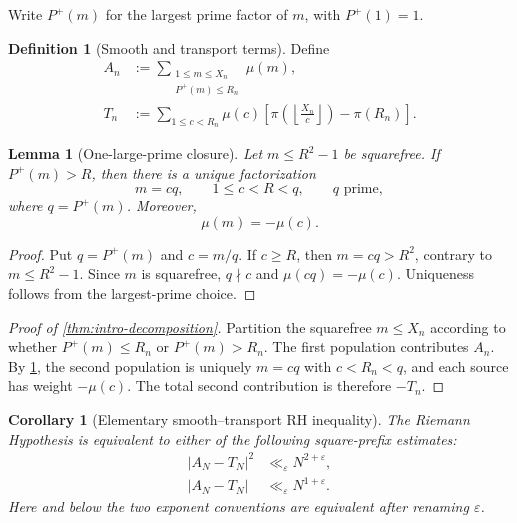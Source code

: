 \documentclass[11pt]{article}
\newtheorem{lemma}[theorem]{Lemma}
\newtheorem{corollary}[theorem]{Corollary}
\theoremstyle{definition}
\newtheorem{definition}[theorem]{Definition}
\theoremstyle{remark}
\newcommand{\eps}{\varepsilon}
\newcommand{\Pplus}{P^{+}}
\newcommand{\1}{\mathbf{1}}
\begin{document}
Write $\Pplus(m)$ for the largest prime factor of $m$, with $\Pplus(1)=1$.

\begin{definition}[Smooth and transport terms]
\label{def:AT}
Define
\begin{align}
 A_n
 &:={\sum}_{\substack{1\le m\le X_n\\\Pplus(m)\le R_n}}\mu(m),
 \label{eq:An}\\
 T_n
 &:={\sum}_{1\le c<R_n}\mu(c)
 \left[
 \pi\!\left(\left\lfloor\frac{X_n}{c}\right\rfloor\right)-\pi(R_n)
 \right].
 \label{eq:Tn}
\end{align}
\end{definition}

\begin{lemma}[One-large-prime closure]
\label{lem:one-large}
Let $m\le R^2-1$ be squarefree.  If $\Pplus(m)>R$, then there is a unique factorization
\begin{equation}
 m=cq,
 \qquad
 1\le c<R<q,
 \qquad
 q\text{ prime},
 \label{eq:one-large}
\end{equation}
where $q=\Pplus(m)$.  Moreover,
\begin{equation}
 \mu(m)=-\mu(c).
 \label{eq:mobius-peel}
\end{equation}
\end{lemma}

\begin{proof}
Put $q=\Pplus(m)$ and $c=m/q$.  If $c\ge R$, then $m=cq>R^2$, contrary to $m\le R^2-1$.  Since $m$ is squarefree, $q\nmid c$ and $\mu(cq)=-\mu(c)$.  Uniqueness follows from the largest-prime choice.
\end{proof}

\begin{proof}[Proof of \cref{thm:intro-decomposition}]
Partition the squarefree $m\le X_n$ according to whether $\Pplus(m)\le R_n$ or $\Pplus(m)>R_n$.  The first population contributes $A_n$.  By \cref{lem:one-large}, the second population is uniquely $m=cq$ with $c<R_n<q$, and each source has weight $-\mu(c)$.  The total second contribution is therefore $-T_n$.
\end{proof}

\begin{corollary}[Elementary smooth--transport RH inequality]
\label{cor:elementary-AT-RH}
The Riemann Hypothesis is equivalent to either of the following square-prefix estimates:
\begin{align}
 |A_N-T_N|^2&\ll_\eps N^{2+\eps},
 \label{eq:elementary-AT-squared}\\
 |A_N-T_N|&\ll_\eps N^{1+\eps}.
 \label{eq:elementary-AT-linear}
\end{align}
Here and below the two exponent conventions are equivalent after renaming $\eps$.
\end{corollary}
\end{document}
